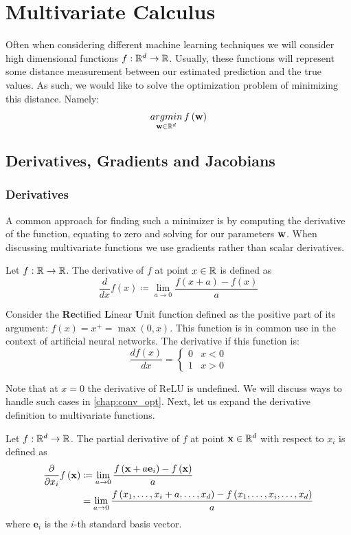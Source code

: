 \section{Multivariate Calculus}
Often when considering different machine learning techniques we will consider high dimensional functions $f:\mathbb{R}^d\rightarrow\mathbb{R}$. Usually, these functions will represent some distance measurement between our estimated prediction and the true values. As such, we would like to solve the optimization problem of minimizing this distance. Namely:
$$\underset{{\mathbf{w}\in \mathbb{R}^d}}{argmin}\, f\left(\mathbf{w}\right)$$

\subsection{Derivatives, Gradients and Jacobians}
\subsubsection{Derivatives}
A common approach for finding such a minimizer is by computing the derivative of the function, equating to zero and solving for our parameters $\mathbf{w}$. When discussing multivariate functions we use gradients rather than scalar derivatives.

\begin{definition}[Derivative]
Let $f:\mathbb{R}\rightarrow\mathbb{R}$. The derivative of $f$ at point $x\in\mathbb{R}$ is defined as $$ \frac{d}{dx}f\left(x\right) \coloneqq\lim_{a\rightarrow0}\frac{f\left(x+a\right)-f\left(x\right)}{a} $$
\end{definition}

\begin{example}[ReLU]
Consider the \textbf{Re}ctified \textbf{L}inear \textbf{U}nit function defined as the positive part of its argument: $f\left(x\right) = x^{+} = \max\left(0, x\right)$. This function is in common use in the context of artificial neural networks. The derivative if this function is:
	$$\frac{df\left(x\right)}{dx}=\begin{cases}
		0 & x<0\\
		1 & x>0
	\end{cases}$$	
\end{example}

Note that at $x=0$ the derivative of ReLU is undefined. We will discuss ways to handle such cases in \autoref{chap:conv_opt}. Next, let us expand the derivative definition to multivariate functions.

\begin{definition}
Let $f:\mathbb{R}^d\rightarrow\mathbb{R}$. The partial derivative of $f$ at point $\mathbf{x}\in\mathbb{R}^d$ with respect to $x_{i}$ is defined as
\begin{align*}
	\frac{\partial}{\partial x_{i}} f\left(\mathbf{x}\right) & \coloneqq \lim_{a\rightarrow0}\frac{f\left(\mathbf{x}+a\mathbf{e}_{i}\right)-f\left(\mathbf{x}\right)}{a}\\
	& =\lim_{a\rightarrow0}\frac{f\left(x_{1},\dots,x_{i}+a,\dots,x_{d}\right)-f\left(x_{1},\dots,x_{i},\dots,x_{d}\right)}{a}
\end{align*}
where $\mathbf{e}_{i}$ is the $i$-th standard basis vector. 
\end{definition}

